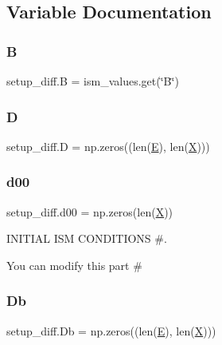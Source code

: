 \subsection{Variable Documentation}
\mbox{\label{namespacesetup__diff_a3ff0214b9ccbb5d3effc3a395ed0b7cf}} 
\subsubsection{\texorpdfstring{B}{B}}
{\footnotesize\ttfamily setup\+\_\+diff.\+B = ism\+\_\+values.\+get(\char`\"{}B\char`\"{})}

\mbox{\label{namespacesetup__diff_a970e7b4693470ff6bf260ec204bd1830}} 
\subsubsection{\texorpdfstring{D}{D}}
{\footnotesize\ttfamily setup\+\_\+diff.\+D = np.\+zeros((len(\hyperlink{namespacesetup__diff_aa5cb1501a25fe4b39a92f30f468e71e8}{E}), len(\hyperlink{namespacesetup__diff_ad01f7c1ee607d8a67926e30be25385f1}{X})))}

\mbox{\label{namespacesetup__diff_aee2506dd929165e6906c9eead3c16d4d}} 
\subsubsection{\texorpdfstring{d00}{d00}}
{\footnotesize\ttfamily setup\+\_\+diff.\+d00 = np.\+zeros(len(\hyperlink{namespacesetup__diff_ad01f7c1ee607d8a67926e30be25385f1}{X}))}



I\+N\+I\+T\+I\+AL I\+SM C\+O\+N\+D\+I\+T\+I\+O\+NS \#. 

You can modify this part \# \mbox{\label{namespacesetup__diff_a692d4517a1c5355e57f331947c97f570}} 
\subsubsection{\texorpdfstring{Db}{Db}}
{\footnotesize\ttfamily setup\+\_\+diff.\+Db = np.\+zeros((len(\hyperlink{namespacesetup__diff_aa5cb1501a25fe4b39a92f30f468e71e8}{E}), len(\hyperlink{namespacesetup__diff_ad01f7c1ee607d8a67926e30be25385f1}{X})))}

